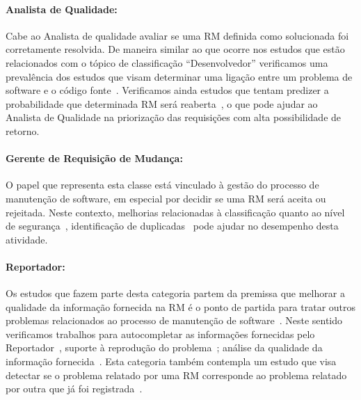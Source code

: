 \paragraph{Analista de Qualidade:} Cabe ao Analista de qualidade avaliar se uma
RM definida como solucionada foi corretamente resolvida. De maneira similar ao
que ocorre nos estudos que estão relacionados com o tópico de classificação
``Desenvolvedor'' verificamos uma prevalência dos estudos que visam determinar
uma ligação entre um problema de software e o código
fonte~\cite{corley2011recovering,Wong:2014:BBF:2705615.2706096,
	Thung:2014:BIT:2635868.2661678,Nguyen:2012:MAR:2393596.2393671,thung2013automatic,
	Romo:2015:TAT:2745802.2745833}. Verificamos ainda estudos que tentam
predizer a probabilidade que determinada RM será
reaberta~\cite{xia2015automatic}, o que pode ajudar ao Analista de Qualidade na
priorização das requisições com alta possibilidade de retorno.

\paragraph{Gerente de Requisição de	Mudança:} O papel que representa esta classe
está vinculado à gestão do processo de manutenção de software, em especial por
decidir se uma RM será aceita ou rejeitada. Neste contexto, melhorias
relacionadas à classificação quanto ao nível de
segurança~\cite{gegick2010identifying, zhang2011bug,
	ValdiviaGarcia:2014:CPB:2597073.2597099}, identificação de
duplicadas~\cite{hindle2016contextual, sun2010discriminative,
	alipour2013contextual, banerjee2012automated} pode ajudar no desempenho
desta atividade.

\paragraph{Reportador:} Os estudos que fazem parte desta categoria  partem da
premissa que melhorar a qualidade da informação fornecida na RM é o ponto de
partida para tratar outros problemas relacionados ao processo de manutenção de
software~\cite{moran2015auto, Moran:2015:EAA:2786805.2807557, Bettenburg2008a}.
Neste sentido verificamos trabalhos para autocompletar as informações fornecidas
pelo Reportador~\cite{moran2015auto}, suporte à reprodução do
problema~\cite{Moran:2015:EAA:2786805.2807557}; análise da qualidade da
informação fornecida~\cite{Bettenburg2008a, Tu:2014:MQI:2677832.2677844}. Esta
categoria também contempla um estudo que visa detectar se o problema relatado
por uma RM corresponde ao problema relatado por outra que já foi
registrada~\cite{Thung2014}.

